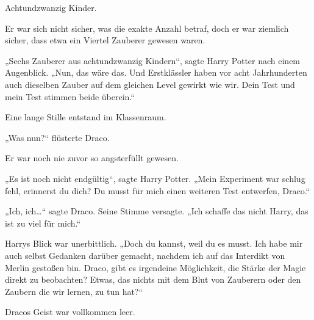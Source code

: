 Achtundzwanzig Kinder.

Er war sich nicht sicher, was die exakte Anzahl betraf, doch er war ziemlich sicher, dass etwa ein Viertel Zauberer gewesen waren.

„Sechs Zauberer aus achtundzwanzig Kindern“, sagte Harry Potter nach einem Augenblick.
„Nun, das wäre das. Und Erstklässler haben vor acht Jahrhunderten auch dieselben Zauber auf dem gleichen Level gewirkt wie wir. Dein Test und mein Test stimmen beide überein.“

Eine lange Stille entstand im Klassenraum.

„Was nun?“ flüsterte Draco.

Er war noch nie zuvor so angsterfüllt gewesen.

„Es ist noch nicht endgültig“, sagte Harry Potter.
„Mein Experiment war schlug fehl, erinnerst du dich? Du musst für mich einen weiteren Test entwerfen, Draco.“

„Ich, ich…“ sagte Draco. Seine Stimme versagte.
„Ich schaffe das nicht Harry, das ist zu viel für mich.“

Harrys Blick war unerbittlich.
„Doch du kannst, weil du es musst. Ich habe mir auch selbst Gedanken darüber gemacht, nachdem ich auf das Interdikt von Merlin gestoßen bin. Draco, gibt es irgendeine Möglichkeit, die Stärke der Magie direkt zu beobachten? Etwas, das nichts mit dem Blut von Zauberern oder den Zaubern die wir lernen, zu tun hat?“

Dracos Geist war vollkommen leer.

